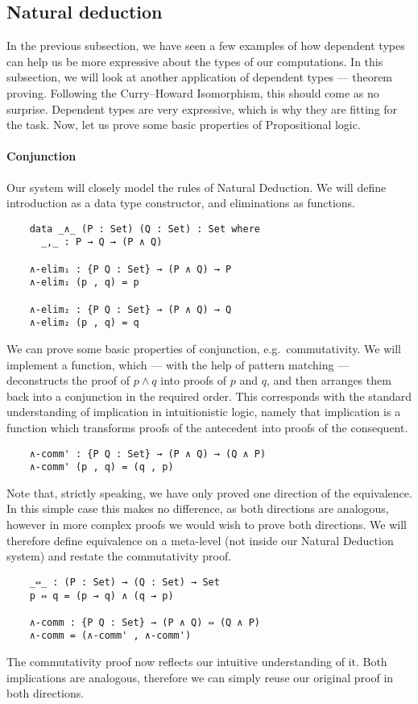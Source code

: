 \documentclass[12pt]{article}
\begin{document}
\subsection{Natural deduction}
In the previous subsection, we have seen a few examples of how dependent types can help us be more expressive about the types of our computations. In this subsection, we will look at another application of dependent types — theorem proving. Following the Curry–Howard Isomorphism, this should come as no surprise. Dependent types are very expressive, which is why they are fitting for the task. Now, let us prove some basic properties of Propositional logic.

\paragraph{Conjunction}
Our system will closely model the rules of Natural Deduction. We will define introduction as a data type constructor, and eliminations as functions.
\begin{verbatim}
    data _∧_ (P : Set) (Q : Set) : Set where
      _,_ : P → Q → (P ∧ Q)

    ∧-elim₁ : {P Q : Set} → (P ∧ Q) → P
    ∧-elim₁ (p , q) = p

    ∧-elim₂ : {P Q : Set} → (P ∧ Q) → Q
    ∧-elim₂ (p , q) = q
\end{verbatim}
We can prove some basic properties of conjunction, e.g.~commutativity. We will implement a function, which — with the help of pattern matching — deconstructs the proof of $p ∧ q$ into proofs of $p$ and $q$, and then arranges them back into a conjunction in the required order. This corresponds with the standard understanding of implication in intuitionistic logic, namely that implication is a function which transforms proofs of the antecedent into proofs of the consequent.
\begin{verbatim}
    ∧-comm' : {P Q : Set} → (P ∧ Q) → (Q ∧ P)
    ∧-comm' (p , q) = (q , p)
\end{verbatim}
Note that, strictly speaking, we have only proved one direction of the equivalence. In this simple case this makes no difference, as both directions are analogous, however in more complex proofs we would wish to prove both directions. We will therefore define equivalence on a meta-level (not inside our Natural Deduction system) and restate the commutativity proof.
\begin{verbatim}
    _⇔_ : (P : Set) → (Q : Set) → Set
    p ⇔ q = (p → q) ∧ (q → p)

    ∧-comm : {P Q : Set} → (P ∧ Q) ⇔ (Q ∧ P)
    ∧-comm = (∧-comm' , ∧-comm')
\end{verbatim}
The commutativity proof now reflects our intuitive understanding of it. Both implications are analogous, therefore we can simply reuse our original proof in both directions.
\end{document}

